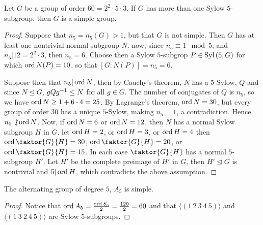 \begin{theorem}\label{4.6.1}
    Let $G$ be a group of order $60=2^2 \cdot 5 \cdot 3$. If $G$ has more than
    one Sylow $5$-subgroup, then $G$ is a simple group.
\end{theorem}
\begin{proof}
    Suppose that $n_5=n_5(G)>1$, but that $G$ is not simple. Then $G$ has at
    least one nontrivial normal subgroup $N$. now, since  $n_5 \equiv 1
    \mod{5}$, and $n_5|12=2^2 \cdot 3$, then $n_5=6$. Choose then a Sylow
    $5$-subgrop $P \in \operatorname{Syl}{(5,G)}$ for which $\operatorname{ord}{N(P)}=10$, so that
    $[G:N(P)]=n_5=6$.

    Suppose then that $n_5|\operatorname{ord}{N}$, then by Cauchy's theorem, $N$ has a
    $5$-Sylow, $Q$ and since $N \unlhd G$, $gQg^{-1} \leq N$ for all $g \in G$.
    The number of conjugates of $Q$ is $n_5$, so we have $\operatorname{ord}{N} \geq 1+6 \cdot
    4=25$. By Lagrange's theorem, $\operatorname{ord}{N}=30$, but every group of order $30$
    has a unique  $5$-Sylow, making  $n_5=1$, a contradiction. Hence $n_5 \not|
    \operatorname{ord}{N}$. Now, if $\operatorname{ord}{N}=6$ or $\operatorname{ord}{N}=12$, then $N$ has a normal Sylow
    subgroup $H$ in $G$. let $\operatorname{ord}{H}=2$, or $\operatorname{ord}{H}=3$, or $\operatorname{ord}{H}=4$ then
    $\ord{\faktor{G}{H}}=30$, $\ord{\faktor{G}{H}}=20$, or
    $\ord{\faktor{G}{H}}=15$. In each case $\faktor{G}{H}$ has a normal
    $5$-subgroup  $H'$. Let  $H'$ be the complete preimage of  $H'$ in  $G$,
    then  $H' \unlhd G$ is nontrivial and  $5|\operatorname{ord}{H}$, which contradicts the
    above assumption.
\end{proof}
\begin{corollary}
    The alternating group of degree $5$,  $A_5$ is simple.
\end{corollary}
\begin{proof}
    Notice that $\operatorname{ord}{A_5}=\frac{\operatorname{ord}{S_5}}{2}=\frac{120}{2}=60$ and that
    $\langle (1 \ 2 \ 3 \ 4 \ 5) \rangle$ and $\langle (1 \ 3 \ 2 \ 4 \ 5)
    \rangle$ are Sylow $5$-subgroups.
\end{proof}

